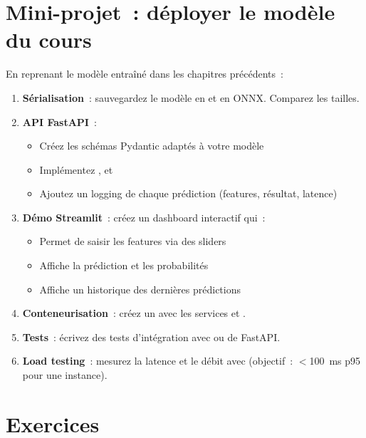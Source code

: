 \section{Mini-projet~: d\'eployer le mod\`ele du cours}
\label{sec:mini-project-ch8}

\begin{miniprojet}[title=\textbf{Mini-projet 8~: API + D\'emo Streamlit}]
En reprenant le mod\`ele entra\^in\'e dans les chapitres pr\'ec\'edents~:
\begin{enumerate}
  \item \textbf{S\'erialisation}~: sauvegardez le mod\`ele en 
    et en ONNX. Comparez les tailles.
  \item \textbf{API FastAPI}~:
    \begin{itemize}
      \item Cr\'eez les sch\'emas Pydantic adapt\'es \`a votre mod\`ele
      \item Impl\'ementez ,  et 
      \item Ajoutez un logging de chaque pr\'ediction (features, r\'esultat,
        latence)
    \end{itemize}
  \item \textbf{D\'emo Streamlit}~: cr\'eez un dashboard interactif qui~:
    \begin{itemize}
      \item Permet de saisir les features via des sliders
      \item Affiche la pr\'ediction et les probabilit\'es
      \item Affiche un historique des derni\`eres pr\'edictions
    \end{itemize}
  \item \textbf{Conteneurisation}~: cr\'eez un 
    avec les services  et .
  \item \textbf{Tests}~: \'ecrivez des tests d'int\'egration avec
     ou  de FastAPI.
  \item \textbf{Load testing}~: mesurez la latence et le d\'ebit avec
     (objectif~: $<$100~ms p95 pour une instance).
\end{enumerate}
\end{miniprojet}

\section{Exercices}
\label{sec:exercises-ch8}

